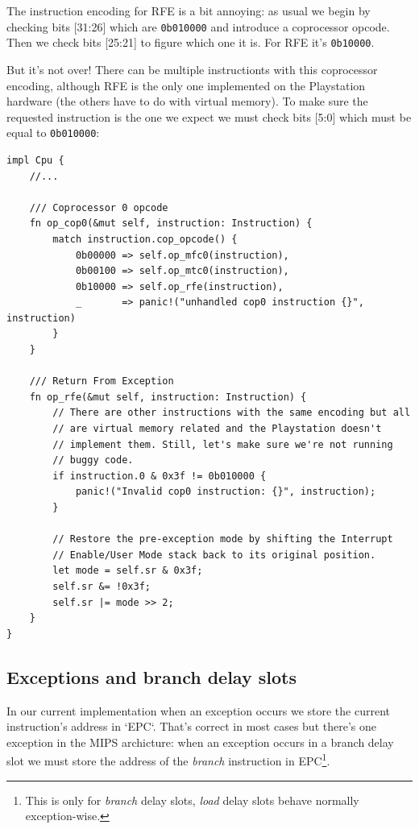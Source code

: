 \documentclass[a4paper]{article}
\newcommand{\code}[1] {\texttt{#1}}
\begin{document}
The instruction encoding for RFE is a bit annoying: as usual we begin
by checking bits [31:26] which are \code{0b010000} and introduce a
coprocessor opcode. Then we check bits [25:21] to figure which one it
is. For RFE it's \code{0b10000}.

But it's not over! There can be multiple instructionts with this
coprocessor encoding, although RFE is the only one implemented on the
Playstation hardware (the others have to do with virtual memory). To
make sure the requested instruction is the one we expect we must check
bits [5:0] which must be equal to \code{0b010000}:

\begin{lstlisting}
impl Cpu {
    //...

    /// Coprocessor 0 opcode
    fn op_cop0(&mut self, instruction: Instruction) {
        match instruction.cop_opcode() {
            0b00000 => self.op_mfc0(instruction),
            0b00100 => self.op_mtc0(instruction),
            0b10000 => self.op_rfe(instruction),
            _       => panic!("unhandled cop0 instruction {}", instruction)
        }
    }

    /// Return From Exception
    fn op_rfe(&mut self, instruction: Instruction) {
        // There are other instructions with the same encoding but all
        // are virtual memory related and the Playstation doesn't
        // implement them. Still, let's make sure we're not running
        // buggy code.
        if instruction.0 & 0x3f != 0b010000 {
            panic!("Invalid cop0 instruction: {}", instruction);
        }

        // Restore the pre-exception mode by shifting the Interrupt
        // Enable/User Mode stack back to its original position.
        let mode = self.sr & 0x3f;
        self.sr &= !0x3f;
        self.sr |= mode >> 2;
    }
}
\end{lstlisting}

\subsection{Exceptions and branch delay slots}

In our current implementation when an exception occurs we store the
current instruction's address in `EPC`. That's correct in most cases
but there's one exception in the MIPS archicture: when an exception
occurs in a branch delay slot we must store the address of the
\emph{branch} instruction in EPC\footnote{ This is only for
  \emph{branch} delay slots, \emph{load} delay slots behave normally
  exception-wise.}.
\end{document}
